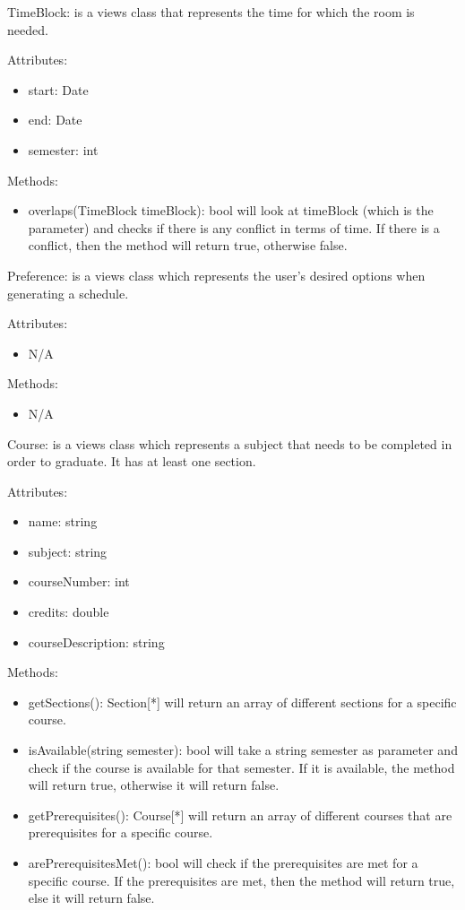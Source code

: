 TimeBlock: is a views class that represents the time for which the room
is needed.

Attributes:

\begin{itemize}
\item
  start: Date
\item
  end: Date
\item
  semester: int
\end{itemize}

Methods:

\begin{itemize}
\item
  overlaps(TimeBlock timeBlock): bool will look at timeBlock (which is
  the parameter) and checks if there is any conflict in terms of time.
  If there is a conflict, then the method will return true, otherwise
  false.
\end{itemize}

Preference: is a views class which represents the user's desired options
when generating a schedule.

Attributes:

\begin{itemize}
\item
  N/A
\end{itemize}

Methods:

\begin{itemize}
\item
  N/A
\end{itemize}

Course: is a views class which represents a subject that needs to be
completed in order to graduate. It has at least one section.

Attributes:

\begin{itemize}
\item
  name: string
\item
  subject: string
\item
  courseNumber: int
\item
  credits: double
\item
  courseDescription: string
\end{itemize}

Methods:

\begin{itemize}
\item
  getSections(): Section{[}*{]} will return an array of different
  sections for a specific course.
\item
  isAvailable(string semester): bool will take a string semester as
  parameter and check if the course is available for that semester. If
  it is available, the method will return true, otherwise it will return
  false.
\item
  getPrerequisites(): Course{[}*{]} will return an array of different
  courses that are prerequisites for a specific course.
\item
  arePrerequisitesMet(): bool will check if the prerequisites are met
  for a specific course. If the prerequisites are met, then the method
  will return true, else it will return false.
\end{itemize}
